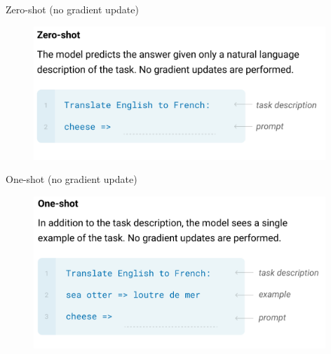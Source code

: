\begin{vbframe}{Zero-shot (no gradient update)}

\vfill

	\begin{figure}
		\centering
		\includegraphics[width=11cm]{figure/gptzeroshot.png}
	\end{figure}

\vfill

\end{vbframe}



\begin{vbframe}{One-shot (no gradient update)}

\vfill

	\begin{figure}
		\centering
		\includegraphics[width=11cm]{figure/gptoneshot.png}
	\end{figure}

\vfill

\end{vbframe}



